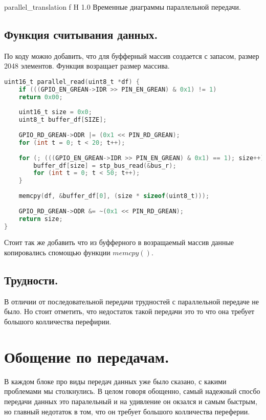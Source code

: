 \documentclass{bmstu}
\begin{document}
	{parallel_translation} %
	{f} %
	{H} %
	{1.0\textwidth} %
	{Временные диаграммы параллельной передачи.}

	\subsection{Функция считывания данных.}
	
	По коду можно добавить, что для буфферный массив создается с запасом, размер 2048 элементов. Функция возращает размер массива.
	
	\begingroup
	\fontsize{12pt}{12pt}\selectfont
	\begin{lstlisting}[language=C]
uint16_t parallel_read(uint8_t *df) {
	if (((GPIO_EN_GREAN->IDR >> PIN_EN_GREAN) & 0x1) != 1)
	return 0x00;
	
	uint16_t size = 0x0;
	uint8_t buffer_df[SIZE];
	
	GPIO_RD_GREAN->ODR |= (0x1 << PIN_RD_GREAN);
	for (int t = 0; t < 20; t++);
	
	for (; (((GPIO_EN_GREAN->IDR >> PIN_EN_GREAN) & 0x1) == 1); size++) {
		buffer_df[size] = stp_bus_read(&bus_r);
		for (int t = 0; t < 50; t++);
	}
	
	memcpy(df, &buffer_df[0], (size * sizeof(uint8_t)));
	
	GPIO_RD_GREAN->ODR &= ~(0x1 << PIN_RD_GREAN);
	return size;
}
	\end{lstlisting}
	\endgroup
	
	Стоит так же добавить что из буфферного в возращаемый массив данные копировались спомощью функции $memcpy()$.
	
	\subsection{Трудности.}
	
	В отличии от последовательной передачи трудностей с параллельной передаче не было. Но стоит отметить, что недостаток такой передачи это то что она требует большого колличества перефирии.
	
	\section{Обощение по передачам.}
	
	В каждом блоке про виды передач данных уже было сказано, с какими проблемами мы столкнулись. В целом говоря обощенно, самый надежный спосбо передачи данных это паралельный и на удивление он окзался и самым быстрым, но главный недотаток в том, что он требует большого колличества переферии.
\end{document}
